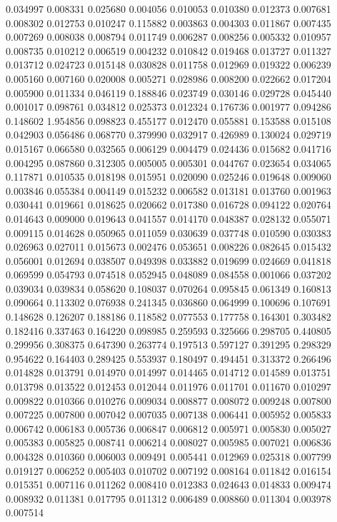 0.034997
0.008331
0.025680
0.004056
0.010053
0.010380
0.012373
0.007681
0.008302
0.012753
0.010247
0.115882
0.003863
0.004303
0.011867
0.007435
0.007269
0.008038
0.008794
0.011749
0.006287
0.008256
0.005332
0.010957
0.008735
0.010212
0.006519
0.004232
0.010842
0.019468
0.013727
0.011327
0.013712
0.024723
0.015148
0.030828
0.011758
0.012969
0.019322
0.006239
0.005160
0.007160
0.020008
0.005271
0.028986
0.008200
0.022662
0.017204
0.005900
0.011334
0.046119
0.188846
0.023749
0.030146
0.029728
0.045440
0.001017
0.098761
0.034812
0.025373
0.012324
0.176736
0.001977
0.094286
0.148602
1.954856
0.098823
0.455177
0.012470
0.055881
0.153588
0.015108
0.042903
0.056486
0.068770
0.379990
0.032917
0.426989
0.130024
0.029719
0.015167
0.066580
0.032565
0.006129
0.004479
0.024436
0.015682
0.041716
0.004295
0.087860
0.312305
0.005005
0.005301
0.044767
0.023654
0.034065
0.117871
0.010535
0.018198
0.015951
0.020090
0.025246
0.019648
0.009060
0.003846
0.055384
0.004149
0.015232
0.006582
0.013181
0.013760
0.001963
0.030441
0.019661
0.018625
0.020662
0.017380
0.016728
0.094122
0.020764
0.014643
0.009000
0.019643
0.041557
0.014170
0.048387
0.028132
0.055071
0.009115
0.014628
0.050965
0.011059
0.030639
0.037748
0.010590
0.030383
0.026963
0.027011
0.015673
0.002476
0.053651
0.008226
0.082645
0.015432
0.056001
0.012694
0.038507
0.049398
0.033882
0.019699
0.024669
0.041818
0.069599
0.054793
0.074518
0.052945
0.048089
0.084558
0.001066
0.037202
0.039034
0.039834
0.058620
0.108037
0.070264
0.095845
0.061349
0.160813
0.090664
0.113302
0.076938
0.241345
0.036860
0.064999
0.100696
0.107691
0.148628
0.126207
0.188186
0.118582
0.077553
0.177758
0.164301
0.303482
0.182416
0.337463
0.164220
0.098985
0.259593
0.325666
0.298705
0.440805
0.299956
0.308375
0.647390
0.263774
0.197513
0.597127
0.391295
0.298329
0.954622
0.164403
0.289425
0.553937
0.180497
0.494451
0.313372
0.266496
0.014828
0.013791
0.014970
0.014997
0.014465
0.014712
0.014589
0.013751
0.013798
0.013522
0.012453
0.012044
0.011976
0.011701
0.011670
0.010297
0.009822
0.010366
0.010276
0.009034
0.008877
0.008072
0.009248
0.007800
0.007225
0.007800
0.007042
0.007035
0.007138
0.006441
0.005952
0.005833
0.006742
0.006183
0.005736
0.006847
0.006812
0.005971
0.005830
0.005027
0.005383
0.005825
0.008741
0.006214
0.008027
0.005985
0.007021
0.006836
0.004328
0.010360
0.006003
0.009491
0.005441
0.012969
0.025318
0.007799
0.019127
0.006252
0.005403
0.010702
0.007192
0.008164
0.011842
0.016154
0.015351
0.007116
0.011262
0.008410
0.012383
0.024643
0.014833
0.009474
0.008932
0.011381
0.017795
0.011312
0.006489
0.008860
0.011304
0.003978
0.007514
